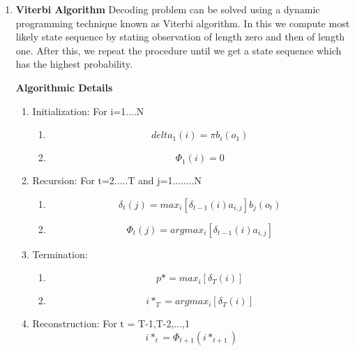 \documentclass[11pt]{report}
\begin{document}
\begin{enumerate}
\item \textbf{Viterbi Algorithm}
Decoding problem can be solved using a dynamic programming technique known as Viterbi algorithm. In this  we compute most likely state sequence by stating  observation of length zero and then of length one. After this, we repeat the procedure until we get a state sequence which has the highest probability.

\textbf {Algorithmic Details}
\begin{enumerate}
\item Initialization: For i=1....N
\begin{enumerate}
\item \begin{equation}
delta_1(i) = \pi b_i(o_1)
\end{equation}
\item  \begin{equation}
\Phi_1(i) = 0
\end{equation}          
\end{enumerate}

\item Recursion: For t=2.....T and j=1........N
\begin{enumerate}
\item \begin{equation}
 \delta_t(j) = max_i [\delta_{t-1}(i)a_{i,j}]b_j(o_t)
\end{equation}
\item \begin{equation}
\Phi_t(j) = argmax_i [\delta_{t-1}(i)a_{i,j}]
\end{equation}
\end{enumerate}           

\item Termination:
\begin{enumerate}
\item \begin{equation} p* = max_i [\delta_T(i)]
\end{equation}
\item \begin{equation}
i*_T = argmax_i [\delta_T(i)]
\end{equation}
\end{enumerate} 

\item Reconstruction: For t = T-1,T-2,...,1
 \begin{equation}
  i*_t = \Phi_{t+1}(i*_{t+1}) 
\end{equation}
\end{enumerate}


\end{enumerate}
\end{document}

